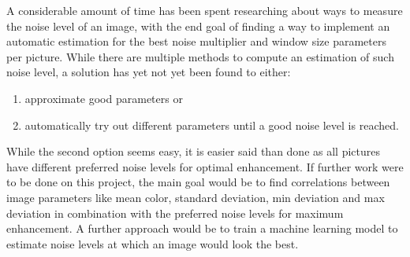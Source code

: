 \documentclass[sigconf]{acmart}
\begin{document}
A considerable amount of time has been spent researching about ways to measure the noise level of an image, with the end goal of finding a way to implement an automatic estimation for the best noise multiplier and window size parameters per picture. While there are multiple methods to compute an estimation of such noise level, a solution has yet not yet been found to either:
\begin{enumerate}
    \item approximate good parameters or
    \item automatically try out different parameters until a good noise level is reached.
\end{enumerate}
While the second option seems easy, it is easier said than done as all pictures have different preferred noise levels for optimal enhancement. If further work were to be done on this project, the main goal would be to find correlations between image parameters like mean color, standard deviation, min deviation and max deviation in combination with the preferred noise levels for maximum enhancement. A further approach would be to train a machine learning model to estimate noise levels at which an image would look the best.



\end{document}
